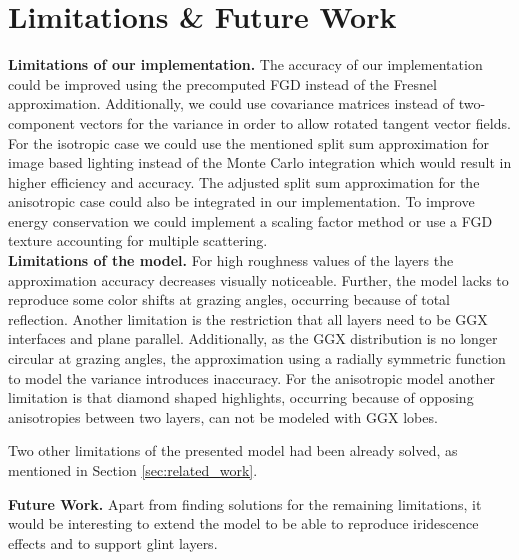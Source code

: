 \section{Limitations \& Future Work}
\label{sec:future_work}

\textbf{Limitations of our implementation.} The accuracy of our implementation could be improved using the precomputed FGD instead of the Fresnel approximation. Additionally, we could use covariance matrices instead of two-component vectors for the variance in order to allow rotated tangent vector fields. For the isotropic case we could use the mentioned split sum approximation for image based lighting instead of the Monte Carlo integration which would result in higher efficiency and accuracy. The adjusted split sum approximation for the anisotropic case could also be integrated in our implementation. To improve energy conservation we could implement a scaling factor method or use a FGD texture accounting for multiple scattering.\\
\textbf{Limitations of the model.} For high roughness values of the layers the approximation accuracy decreases visually noticeable. Further, the model lacks to reproduce some color shifts at grazing angles, occurring because of total reflection. Another limitation is the restriction that all layers need to be GGX interfaces and plane parallel. Additionally, as the GGX distribution is no longer circular at grazing angles, the approximation using a radially symmetric function to model the variance introduces inaccuracy. For the anisotropic model another limitation is that diamond shaped highlights, occurring because of opposing anisotropies between two layers, can not be modeled with GGX lobes.

%

Two other limitations of the presented model had been already solved, as mentioned in Section \ref{sec:related_work}.

\noindent\textbf{Future Work.} Apart from finding solutions for the remaining limitations, it would be interesting to extend the model to be able to reproduce iridescence effects and to support glint layers.